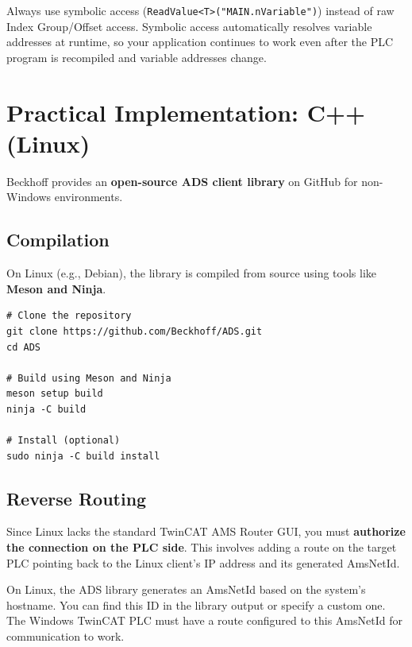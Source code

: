 \documentclass[11pt,a4paper]{article}
\begin{document}
\begin{tipbox}
Always use symbolic access (\texttt{ReadValue<T>("MAIN.nVariable")}) instead of raw Index Group/Offset access. Symbolic access automatically resolves variable addresses at runtime, so your application continues to work even after the PLC program is recompiled and variable addresses change.
\end{tipbox}

\section{Practical Implementation: C++ (Linux)}

Beckhoff provides an \textbf{open-source ADS client library} on GitHub for non-Windows environments.

\subsection{Compilation}

On Linux (e.g., Debian), the library is compiled from source using tools like \textbf{Meson and Ninja}.

\begin{verbatim}
# Clone the repository
git clone https://github.com/Beckhoff/ADS.git
cd ADS

# Build using Meson and Ninja
meson setup build
ninja -C build

# Install (optional)
sudo ninja -C build install
\end{verbatim}

\subsection{Reverse Routing}

Since Linux lacks the standard TwinCAT AMS Router GUI, you must \textbf{authorize the connection on the PLC side}. This involves adding a route on the target PLC pointing back to the Linux client's IP address and its generated AmsNetId.

\begin{notebox}
On Linux, the ADS library generates an AmsNetId based on the system's hostname. You can find this ID in the library output or specify a custom one. The Windows TwinCAT PLC must have a route configured to this AmsNetId for communication to work.
\end{notebox}
\end{document}
